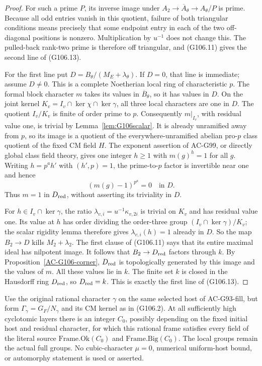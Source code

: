 \begin{proof}
For such a prime \(P\), its inverse image under
\(A_2\to\overline A_\theta\to A_\theta/P\) is prime.
Because all odd entries vanish in this quotient, failure of both
triangular conditions means precisely that some endpoint entry
in each of the two off-diagonal positions is nonzero.
Multiplication by \(u^{-1}\) does not change this.
The pulled-back rank-two prime is therefore off triangular,
and (G106.11) gives the second line of (G106.13).

For the first line put
\(D=B_\theta/(M_E+\lambda_\theta)\).
If \(D=0\), that line is immediate; assume \(D\ne0\).
This is a complete Noetherian local ring of characteristic \(p\).
The formal block character \(m\) takes its values in
\(\overline B_\theta\), so it has values in \(D\).
On the joint kernel \(K_v=I_v\cap\ker\chi\cap\ker\gamma\),
all three local characters are one in \(D\).
The quotient \(I_v/K_v\) is finite of order prime to \(p\).
Consequently \(m|_{I_v}\), with residual value one, is trivial
by Lemma~\ref{lem:G106scalar}.
It is already unramified away from \(p\), so its image is a
quotient of the everywhere-unramified abelian pro-\(p\) class
quotient of the fixed CM field \(H\).
The exponent assertion of AC-G99, or directly global class field
theory, gives one integer \(h\ge1\) with \(m(g)^h=1\) for
all \(g\).  Writing \(h=p^a h'\) with \((h',p)=1\), the
prime-to-\(p\) factor is invertible near one and hence
\[
                       (m(g)-1)^{p^a}=0\quad\text{in }D.
 \tag{G106.14}
\]
Thus \(m=1\) in \(D_{\rm red}\), without asserting its
triviality in \(D\).

For \(h\in I_v\cap\ker\gamma\), the ratio
\(\lambda_{v,i}=u^{-1}\kappa_{v,2i}\) is trivial on \(K_v\)
and has residual value one.  Its value at \(h\) has order
dividing the order-three group
\((I_v\cap\ker\gamma)/K_v\); the scalar rigidity lemma
therefore gives \(\lambda_{v,i}(h)=1\) already in \(D\).
So the map \(B_2\to D\) kills \(M_2+\lambda_2\).
The first clause of (G106.11) says that its entire maximal ideal
has nilpotent image.  It follows that \(B_2\to D_{\rm red}\)
factors through \(k\).
By Proposition~\ref{AC-G106-corner}, \(D_{\rm red}\) is
 topologically generated by this image and the values of \(m\).
All these values lie in \(k\).  The finite set \(k\) is closed
in the Hausdorff ring \(D_{\rm red}\), so \(D_{\rm red}=k\).
This is exactly the first line of (G106.13).
\end{proof}

\begin{proposition}
\label{AC-G106-frame}
Use the original rational character \(\gamma\) on the same selected
host of AC-G93-fill, but form \(\Gamma_\gamma=G_F/N_\gamma\)
and its CM kernel as in (G106.2).  At all sufficiently high
cyclotomic layers there is an integer \(C_0\), possibly depending
on the fixed initial host and residual character, for which this
rational frame satisfies every field of the literal source
\(\mathrm{Frame.Ok}(C_0)\) and \(\mathrm{Frame.Big}(C_0)\).
The local groups remain the actual full groups.
No cubic-character \(\mu=0\), numerical uniform-host bound,
or automorphy statement is used or asserted.
\end{proposition}

